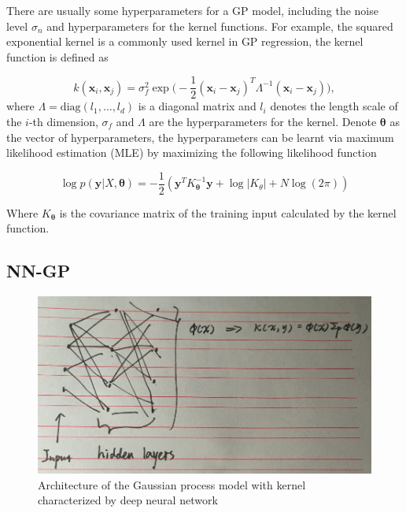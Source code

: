 There are usually some hyperparameters for a GP model, including the noise level $\sigma_n$ and hyperparameters for the kernel functions. For example, the squared exponential kernel is a commonly used kernel in GP regression, the kernel function is defined as

\begin{equation}
    \label{eq:GaussianCovarianceFunction}
    k(\bm{x}_i, \bm{x}_j) = \sigma_f^2 \exp\Big(-\frac{1}{2}(\bm{x}_i - \bm{x}_j)^T\Lambda^{-1}(\bm{x}_i - \bm{x}_j)\Big),
\end{equation}
where $\Lambda = \mathrm{diag}(l_1, \dots, l_d)$ is a diagonal matrix and $l_i$ denotes the length scale of the $i$-th dimension, $\sigma_f$ and $\Lambda$ are the hyperparameters for the kernel. Denote $\bm{\theta}$ as the vector of hyperparameters, the hyperparameters can be learnt via maximum likelihood estimation (MLE) by maximizing the following likelihood function

\begin{equation}
    \label{eq:GPloglikelihood}
    \log p(\bm{y} | X, \bm{\theta}) = -\frac{1}{2}(\bm{y}^T K_{\bm{\theta}}^{-1} \bm{y} + \log |K_{\theta}| + N \log(2 \pi))
\end{equation}

Where $K_{\bm{\theta}}$ is the covariance matrix of the training input calculated by the kernel function.

\subsection{NN-GP}\label{sec:NNGP}

\begin{figure}[!htb]
    \centering
    \includegraphics[width=\columnwidth]{./img/NN-GP.png}
    \caption{Architecture of the Gaussian process model with kernel characterized by deep neural network}
    \label{fig:NNGP}
\end{figure}

